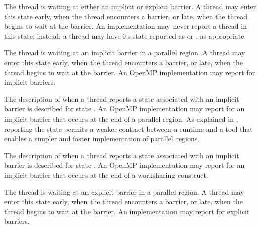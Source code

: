 \begin{description}

  \item {} 
  
  \sloppy
  The thread is waiting at either an implicit or explicit barrier.
  A thread may enter this state
  early, when the thread encounters a barrier, or late, when the
  thread begins to wait at the barrier. An implementation may never report a thread in this state; instead, a thread may have its state reported
  as   or , as appropriate.
  
  \item {} 
  
  \sloppy
  The thread is waiting at an implicit barrier in a parallel region. 
  A  thread may enter this state
  early, when the thread encounters a barrier, or late, when the
  thread begins to wait at the barrier.
  An OpenMP implementation may report  
  for implicit barriers.
  
  \item {} 

  The description of when a thread reports a state associated with an implicit barrier
  is described for state .  
  An OpenMP implementation may report  
  for an implicit barrier that occurs at the end of a parallel region. 
  As explained in ,
  reporting the state  
  permits a weaker contract between a runtime and a tool that 
  enables a simpler and faster implementation of parallel regions.

  \item {} 

  The description of when a thread reports a state associated with an implicit barrier
  is described for state .  
  An OpenMP implementation may report  
  for an implicit barrier that occurs at the end of a worksharing construct.

  \item {} 

  The thread is waiting at an explicit barrier  in a parallel region. 
  A thread may enter this state
  early, when the thread encounters a barrier, or late, when the
  thread begins to wait at the barrier.
  An implementation may report  
  for explicit barriers.

  
\end{description}
  
